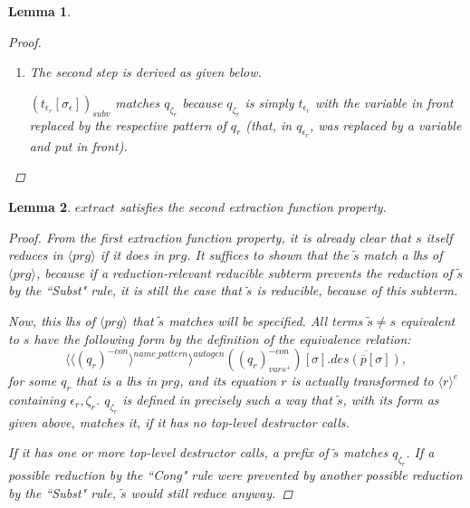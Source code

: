 \documentclass[11pt]{article} %
\newtheorem*{lemma*}{Lemma}
\begin{document}
\begin{framed}
\begin{lemma*}
\begin{proof}
\begin{enumerate}
\item The second step is derived as given below.
\begin{prooftree}
\end{prooftree}
$(t_{\epsilon_r}[\sigma_\epsilon])_{subv}$ matches $q_{\zeta_r}$ because $q_{\zeta_r}$ is simply $t_{\epsilon_r}$ with the variable in front replaced by the respective pattern of $q_r$ (that, in $q_{\epsilon_r}$, was replaced by a variable and put in front).

\end{enumerate}

\end{proof}

\end{lemma*}

\begin{lemma*}

$extract$ satisfies the second extraction function property.

\begin{proof}

From the first extraction function property, it is already clear that $s$ itself reduces in $\langle prg \rangle$ if it does in $prg$. It suffices to shown that the $\widetilde{s}$ match a lhs of $\langle prg \rangle$, because if a reduction-relevant reducible subterm prevents the reduction of $\widetilde{s}$ by the ``Subst" rule, it is still the case that $\widetilde{s}$ is reducible, because of this subterm.

Now, this lhs of $\langle prg \rangle$ that $\widetilde{s}$ matches will be specified. All terms $\widetilde{s} \neq s$ equivalent to $s$ have the following form by the definition of the equivalence relation:
\begin{equation*}
\langle \langle (q_r)^{-con} \rangle^{name\_pattern} \rangle^{autogen}((q_r)^{-con}_{vars^+})[\sigma].\overline{des(\overline{p}[\sigma])},
\end{equation*}
for some $q_r$ that is a lhs in $prg$, and its equation $r$ is actually transformed to $\langle r \rangle^e$ containing $\epsilon_r, \zeta_r$. $q_{\zeta_r}$ is defined in precisely such a way that $\widetilde{s}$, with its form as given above, matches it, if it has no top-level destructor calls.

If it has one or more top-level destructor calls, a prefix of $\widetilde{s}$ matches $q_{\zeta_r}$. If a possible reduction by the ``Cong" rule were prevented by another possible reduction by the ``Subst" rule, $\widetilde{s}$ would still reduce anyway.


\end{proof}
\end{lemma*}
\end{framed}
\end{document}
